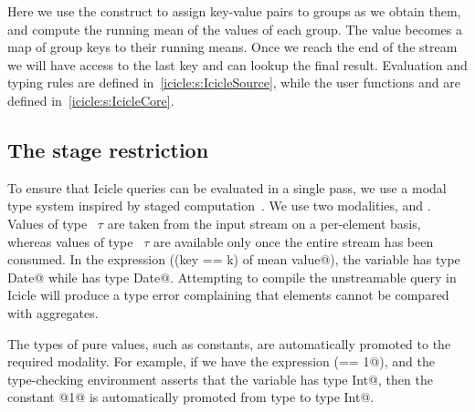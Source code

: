 Here we use the \Ic@group@ construct to assign key-value pairs to groups as we obtain them, and compute the running mean of the values of each group. The \Ic@avgs@ value becomes a map of group keys to their running means. Once we reach the end of the stream we will have access to the last key and can lookup the final result.
Evaluation and typing rules are defined in~\cref{icicle:s:IcicleSource}, while the user functions \Ic@last@ and \Ic@mean@ are defined in~\cref{icicle:s:IcicleCore}.


\subsection{The stage restriction}
To ensure that Icicle queries can be evaluated in a single pass, we use a modal type system inspired by staged computation~\cite{davies2001modal}.
We use two modalities, \Ic@Element@ and \Ic@Aggregate@.
Values of type \Ic@Element@~$\tau$ are taken from the input stream on a per-element basis, whereas values of type \Ic@Aggregate@~$\tau$ are available only once the entire stream has been consumed.
In the expression (\Ic@filter (key == k) of mean value@), the variable \Ic@key@ has type \Ic@Element Date@ while \Ic@k@ has type \Ic@Aggregate Date@.
Attempting to compile the unstreamable query in Icicle will produce a type error complaining that elements cannot be compared with aggregates.

The types of pure values, such as constants, are automatically promoted to the required modality.
For example, if we have the expression (\Ic@open == 1@), and the type-checking environment asserts that the variable \Ic@open@ has type \Ic@Element Int@, then the constant @1@ is automatically promoted from type \Ic@Int@ to type \Ic@Element Int@.


